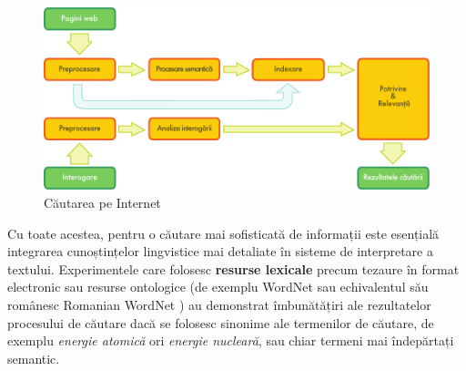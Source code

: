 \begin{multicols}{2}
\begin{figure}[htb]
\center
\includegraphics[width=\textwidth]{../_media/romanian/web_search_architecture}
\caption{Căutarea pe Internet}
\label{fig:websearcharch_de}
\vspace{-15mm}
\end{figure}

Cu toate acestea, pentru o căutare mai sofisticată de informații este esențială integrarea cunoștințelor lingvistice mai detaliate în sisteme de interpretare a textului. Experimentele care folosesc \textbf{resurse lexicale} precum tezaure în format electronic sau resurse ontologice (de exemplu WordNet sau echivalentul său românesc Romanian WordNet \cite{WN} ) au demonstrat îmbunătățiri ale rezultatelor procesului de căutare dacă se folosesc sinonime ale termenilor de căutare, de exemplu \textit{energie atomică} ori \textit{energie nucleară}, sau chiar termeni mai îndepărtați semantic.



\end{multicols}
